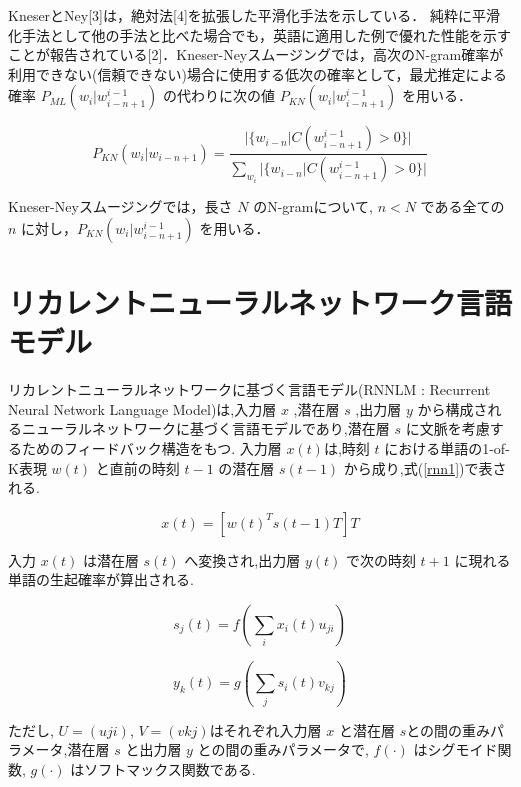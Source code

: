 
KneserとNey[3]は，絶対法[4]を拡張した平滑化手法を示している．
純粋に平滑化手法として他の手法と比べた場合でも，英語に適用した例で優れた性能を示すことが報告されている[2]．Kneser-Neyスムージングでは，高次のN-gram確率が利用できない(信頼できない)場合に使用する低次の確率として，最尤推定による確率 $P_{ML} (w_i|w_{i-n+1}^{i-1})$ の代わりに次の値 $P_{KN} (w_i|w_{i-n+1}^{i-1})$ を用いる．

\begin{equation}
		P_{KN} (w_i|w_{i-n+1}) = \frac{|\{w_{i-n}|C(w_{i-n+1}^{i-1}) > 0\}|}{\sum_{w_i} |\{w_{i-n}|C(w_{i-n+1}^{i-1}) > 0\}|} 
    \label{ngram_smoosing2}
\end{equation}

Kneser-Neyスムージングでは，長さ $N$ のN-gramについて, $n  <  N$ である全ての $n$ に対し，$P_{KN} (w_i|w_{i-n+1}^{i-1})$ を用いる．

\section{リカレントニューラルネットワーク言語モデル}
リカレントニューラルネットワークに基づく言語モデル(RNNLM : Recurrent Neural Network Language Model)は,入力層 $x$ ,潜在層 $s$ ,出力層 $y$ から構成されるニューラルネットワークに基づく言語モデルであり,潜在層 $s$ に文脈を考慮するためのフィードバック構造をもつ. 入力層 $x(t)$は,時刻 $t$ における単語の1-of-K表現 $w(t)$ と直前の時刻 $t−1$
の潜在層 $s(t−1)$ から成り,式(\ref{rnn1})で表される.

\begin{equation}
		x(t) = [w(t)^T s(t-1)T]T
    \label{rnn1}
\end{equation}

入力 $x(t)$ は潜在層 $s(t)$ へ変換され,出力層 $y(t)$ で次の時刻 $t+1$ に現れる単語の生起確率が算出される.

\begin{equation}
		s_j(t) = f(\sum_i x_i(t) u_{ji})
    \label{rnn2}
\end{equation}

\begin{equation}
		y_k(t) = g(\sum_j s_i(t) v_{kj})
    \label{rnn3}
\end{equation}

ただし, $U=(uji)$, $V=(vkj)$はそれぞれ入力層 $x$ と潜在層 $s$との間の重みパラメータ,潜在層 $s$
と出力層 $y$ との間の重みパラメータで, $f(·)$ はシグモイド関数, $g(·)$ はソフトマックス関数である.


